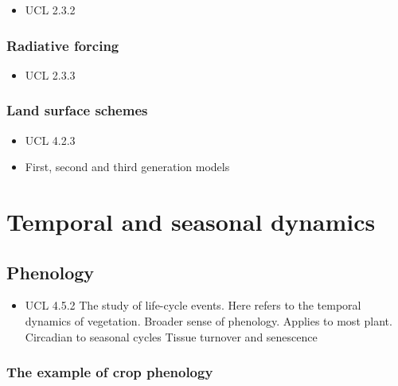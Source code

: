 \documentclass[
  oneside]{book}
\providecommand{\tightlist}{%
  \setlength{\itemsep}{0pt}\setlength{\parskip}{0pt}}
\begin{document}
\begin{itemize}
\tightlist
\item
  UCL 2.3.2
\end{itemize}

\hypertarget{radiative-forcing}{%
\subsection{Radiative forcing}\label{radiative-forcing}}

\begin{itemize}
\tightlist
\item
  UCL 2.3.3
\end{itemize}

\hypertarget{land-surface-schemes}{%
\subsection{Land surface schemes}\label{land-surface-schemes}}

\begin{itemize}
\tightlist
\item
  UCL 4.2.3
\item
  First, second and third generation models
\end{itemize}

\hypertarget{temporal-and-seasonal-dynamics}{%
\chapter{Temporal and seasonal dynamics}\label{temporal-and-seasonal-dynamics}}


\hypertarget{phenology}{%
\section{Phenology}\label{phenology}}

\begin{itemize}
\tightlist
\item
  UCL 4.5.2
  The study of life-cycle events. Here refers to the temporal dynamics of vegetation.
  Broader sense of phenology.
  Applies to most plant. Circadian to seasonal cycles
  Tissue turnover and senescence
\end{itemize}

\hypertarget{the-example-of-crop-phenology}{%
\subsection{The example of crop phenology}\label{the-example-of-crop-phenology}}
\end{document}
